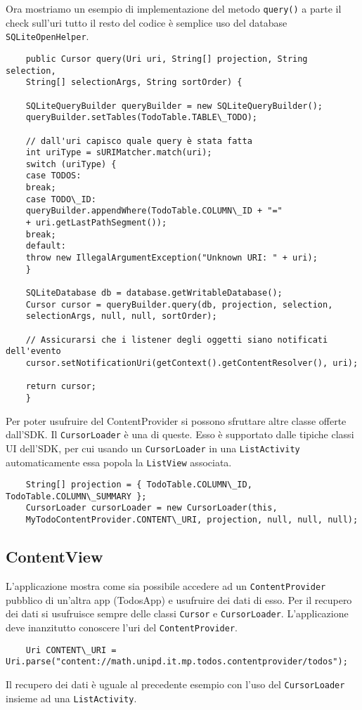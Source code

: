 	Ora mostriamo un esempio di implementazione del metodo \lstinline|query()| a parte il check sull'uri tutto il resto del codice è semplice uso del database \lstinline|SQLiteOpenHelper|.
	\begin{lstlisting}
	public Cursor query(Uri uri, String[] projection, String selection,
	String[] selectionArgs, String sortOrder) {

	SQLiteQueryBuilder queryBuilder = new SQLiteQueryBuilder();
	queryBuilder.setTables(TodoTable.TABLE\_TODO);

	// dall'uri capisco quale query è stata fatta
	int uriType = sURIMatcher.match(uri);
	switch (uriType) {
	case TODOS:
	break;
	case TODO\_ID:
	queryBuilder.appendWhere(TodoTable.COLUMN\_ID + "="
	+ uri.getLastPathSegment());
	break;
	default:
	throw new IllegalArgumentException("Unknown URI: " + uri);
	}

	SQLiteDatabase db = database.getWritableDatabase();
	Cursor cursor = queryBuilder.query(db, projection, selection,
	selectionArgs, null, null, sortOrder);

	// Assicurarsi che i listener degli oggetti siano notificati dell'evento
	cursor.setNotificationUri(getContext().getContentResolver(), uri);

	return cursor;
	}
	\end{lstlisting}

	Per poter usufruire del ContentProvider si possono sfruttare altre classe offerte dall'SDK. Il \lstinline|CursorLoader| è una di queste. Esso è supportato dalle tipiche classi UI dell'SDK, per cui usando un \lstinline|CursorLoader| in una \lstinline|ListActivity| automaticamente essa popola la \lstinline|ListView| associata.
	\begin{lstlisting}
	String[] projection = { TodoTable.COLUMN\_ID, TodoTable.COLUMN\_SUMMARY };
	CursorLoader cursorLoader = new CursorLoader(this,
	MyTodoContentProvider.CONTENT\_URI, projection, null, null, null);
	\end{lstlisting}


	\subsection{ContentView}
	L'applicazione mostra come sia possibile accedere ad un
\lstinline|ContentProvider| pubblico di un'altra app (TodosApp) e usufruire dei
dati di esso. Per il recupero dei dati si usufruisce sempre delle classi
\lstinline|Cursor| e \lstinline|CursorLoader|.
	L'applicazione deve inanzitutto conoscere l'uri del \lstinline|ContentProvider|.
	\begin{lstlisting}
	Uri CONTENT\_URI = Uri.parse("content://math.unipd.it.mp.todos.contentprovider/todos");
	\end{lstlisting}
	Il recupero dei dati è uguale al precedente esempio con l'uso del
\lstinline|CursorLoader| insieme ad una \lstinline|ListActivity|.

